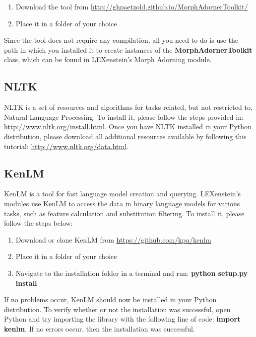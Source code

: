 \begin{enumerate}
	\item Download the tool from \url{http://ghpaetzold.github.io/MorphAdornerToolkit/}
	\item Place it in a folder of your choice
\end{enumerate}

Since the tool does not require any compilation, all you need to do is use the path in which you installed it to create instances of the \textbf{MorphAdornerToolkit} class, which can be found in LEXenstein's Morph Adorning module.








\subsection{NLTK}

NLTK \cite{nltk} is a set of resources and algorithms for tasks related, but not restricted to, Natural Language Processing. To install it, please follow the steps provided in: \url{http://www.nltk.org/install.html}. Once you have NLTK installed in your Python distribution, please download all additional resources available by following this tutorial: \url{http://www.nltk.org/data.html}.






\subsection{KenLM}

KenLM \cite{kenlm} is a tool for fast language model creation and querying. LEXenstein's modules use KenLM to access the data in binary language models for various tasks, such as feature calculation and substitution filtering. To install it, please follow the steps below:

\begin{enumerate}
	\item Download or clone KenLM from \url{https://github.com/kpu/kenlm}
	\item Place it in a folder of your choice
	\item Navigate to the installation folder in a terminal and run: \textbf{python setup.py install}
\end{enumerate}

If no problems occur, KenLM should now be installed in your Python distribution. To verify whether or not the installation was successful, open Python and try importing the library with the following line of code: \textbf{import kenlm}. If no errors occur, then the installation was successful.







